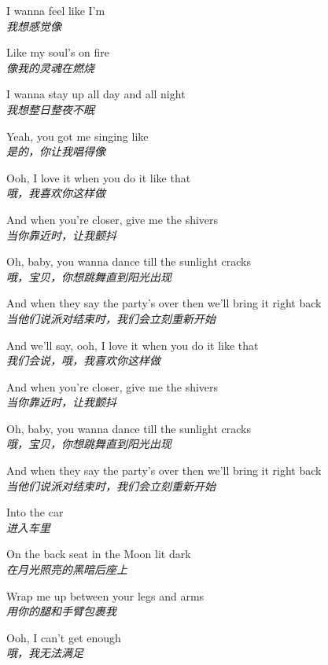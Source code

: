 \begin{spacing}{1.5}
\begin{flushleft}
I wanna feel like I'm\\
\textit{我想感觉像}\lyricspace

Like my soul's on fire\\
\textit{像我的灵魂在燃烧}\lyricspace

I wanna stay up all day and all night\\
\textit{我想整日整夜不眠}\lyricspace

Yeah, you got me singing like\\
\textit{是的，你让我唱得像}\lyricspace

Ooh, I love it when you do it like that\\
\textit{哦，我喜欢你这样做}\lyricspace

And when you're closer, give me the shivers\\
\textit{当你靠近时，让我颤抖}\lyricspace

Oh, baby, you wanna dance till the sunlight cracks\\
\textit{哦，宝贝，你想跳舞直到阳光出现}\lyricspace

And when they say the party's over then we'll bring it right back\\
\textit{当他们说派对结束时，我们会立刻重新开始}\lyricspace

And we'll say, ooh, I love it when you do it like that\\
\textit{我们会说，哦，我喜欢你这样做}\lyricspace

And when you're closer, give me the shivers\\
\textit{当你靠近时，让我颤抖}\lyricspace

Oh, baby, you wanna dance till the sunlight cracks\\
\textit{哦，宝贝，你想跳舞直到阳光出现}\lyricspace

And when they say the party's over then we'll bring it right back\\
\textit{当他们说派对结束时，我们会立刻重新开始}\lyricspace

Into the car\\
\textit{进入车里}\lyricspace

On the back seat in the Moon lit dark\\
\textit{在月光照亮的黑暗后座上}\lyricspace

Wrap me up between your legs and arms\\
\textit{用你的腿和手臂包裹我}\lyricspace

Ooh, I can't get enough\\
\textit{哦，我无法满足}\lyricspace


\end{flushleft}
\end{spacing}
